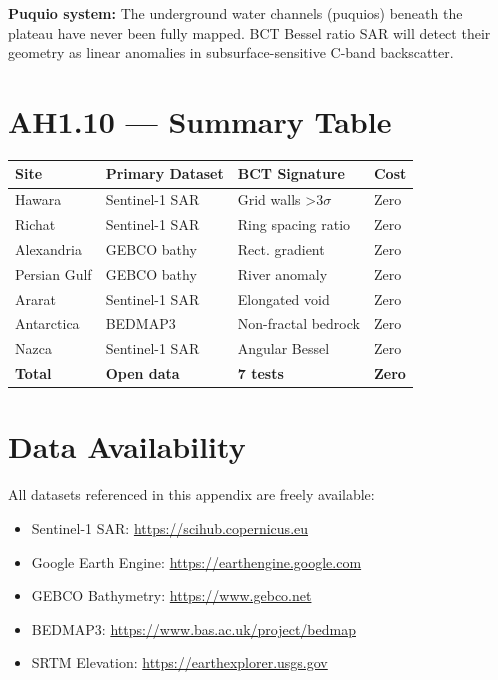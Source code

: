 \documentclass[12pt,twocolumn]{article}
\begin{document}
\textbf{Puquio system:} The underground water channels
(puquios) beneath the plateau have never been fully mapped.
BCT Bessel ratio SAR will detect their geometry as linear
anomalies in subsurface-sensitive C-band backscatter.

\section{AH1.10 --- Summary Table}

\begin{center}
{\small
\begin{tabular}{p{1.8cm}p{2.2cm}p{2.0cm}p{1.5cm}}
\hline\hline
Site & Primary Dataset & BCT Signature & Cost \\
\hline
Hawara & Sentinel-1 SAR & Grid walls >3$\sigma$ & Zero \\
Richat & Sentinel-1 SAR & Ring spacing ratio & Zero \\
Alexandria & GEBCO bathy & Rect. gradient & Zero \\
Persian Gulf & GEBCO bathy & River anomaly & Zero \\
Ararat & Sentinel-1 SAR & Elongated void & Zero \\
Antarctica & BEDMAP3 & Non-fractal bedrock & Zero \\
Nazca & Sentinel-1 SAR & Angular Bessel & Zero \\
\hline
\textbf{Total} & \textbf{Open data} & \textbf{7 tests} & \textbf{Zero} \\
\hline\hline
\end{tabular}
}
\end{center}

\section*{Data Availability}

All datasets referenced in this appendix are freely available:
\begin{itemize}
\item Sentinel-1 SAR: \url{https://scihub.copernicus.eu}
\item Google Earth Engine: \url{https://earthengine.google.com}
\item GEBCO Bathymetry: \url{https://www.gebco.net}
\item BEDMAP3: \url{https://www.bas.ac.uk/project/bedmap}
\item SRTM Elevation: \url{https://earthexplorer.usgs.gov}
\end{itemize}
\end{document}

